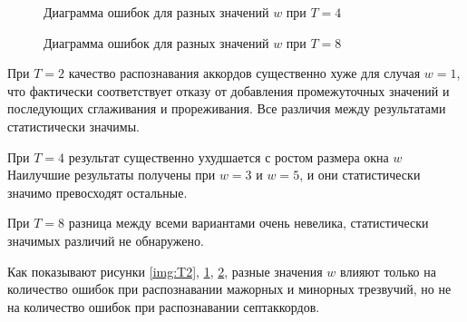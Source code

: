 \begin{figure}[h]
  \begin{minipage}[h]{0.49\linewidth}
  \end{minipage}
  \hfill
  \begin{minipage}[h]{0.49\linewidth}
  \end{minipage}
  \caption{Диаграмма ошибок для разных значений $w$ при $T=4$}
  \label{img:T4}
\end{figure}

\begin{figure}[h]
  \begin{minipage}[h]{0.49\linewidth}
  \end{minipage}
  \hfill
  \begin{minipage}[h]{0.49\linewidth}
  \end{minipage}
  \caption{Диаграмма ошибок для разных значений $w$ при $T=8$}
  \label{img:T8}
\end{figure}

При $T=2$ качество распознавания аккордов существенно хуже для случая $w=1$, что
фактически соответствует отказу от добавления промежуточных значений и
последующих сглаживания и прореживания. Все различия между результатами
статистически значимы.

При $T=4$ результат существенно ухудшается с ростом размера окна $w$ Наилучшие
результаты получены при $w=3$ и $w=5$, и они статистически значимо превосходят
остальные.

При $T=8$ разница между всеми вариантами очень невелика, статистически значимых
различий не обнаружено.

Как показывают рисунки \ref{img:T2}, \ref{img:T4}, \ref{img:T8}, разные значения
$w$ влияют только на количество ошибок при распознавании мажорных и минорных
трезвучий, но не на количество ошибок при распознавании септаккордов.

% 

